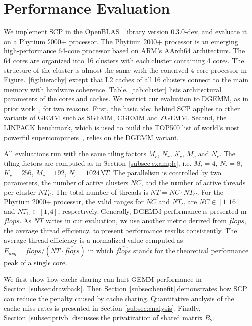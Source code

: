 \section{Performance Evaluation}\label{sec:evaluation}

We implement SCP in the OpenBLAS~\cite{openblas} library version 0.3.0-dev,
and evaluate it on a Phytium 2000+ processor.
The Phytium 2000+ processor is an emerging high-performance
64-core processor based on ARM's AArch64 architecture.
The 64 cores are organized into 16 clusters with each
cluster containing 4 cores.
The structure of the cluster is almost the same with
the contrived 4-core processor in Figure.~\ref{fig:hierachy}
except that L2 caches of all 16 clusters connect to the main memory
with hardware coherence.
Table.~\ref{tab:cluster} lists architectural parameters of the cores and caches.
We restrict our evaluation to DGEMM,
as in prior work~\cite{blispar,augem,poetmicro}, for two reasons.
First, the basic idea behind SCP applies to other
variants of GEMM such as SGEMM, CGEMM and ZGEMM.
Second, the LINPACK benchmark, which is used to build the
TOP500 list of world's most powerful supercomputers~\cite{top500},
relies on the DGEMM variant.

All evaluations run with the same tiling factors
$M_r$, $N_r$, $K_c$, $M_c$ and $N_c$.
The tiling factors are computed as in Section~\ref{subsec:example},
i.e. $M_r = 4$, $N_r = 8$, $K_c = 256$, $M_c = 192$, $N_c = 1024NT$.
The parallelism is controlled by two parameters,
the number of active clusters $NC$,
and the number of active threads per cluster $NT_C$.
The total number of threads is $NT = NC \cdot NT_C$.
For the Phytium 2000+ processor, the valid ranges for $NC$ and $NT_C$
are $NC \in [1, 16]$ and $NT_C \in [1, 4]$, respectively.
Generally, DGEMM performance is presented in $flops$.
As $NT$ varies in our evaluation,
we use another metric derived from $flops$,
the average thread efficiency,
to present performance results consistently.
The average thread efficiency is a normalized value computed as
$E_{avg} = flops / (NT \cdot \widehat{flops})$
in which $\widehat{flops}$ stands for the theoretical performance peak of a single core.

We first show how cache sharing can hurt GEMM performance
in Section~\ref{subsec:drawback}.
Then Section~\ref{subsec:benefit} demonstrates how SCP can reduce
the penalty caused by cache sharing.
Quantitative analysis of the cache miss rates
is presented in Section~\ref{subsec:analysis}.
Finally, Section~\ref{subsec:privb} discusses
the privatization of shared matrix $B_2$.

